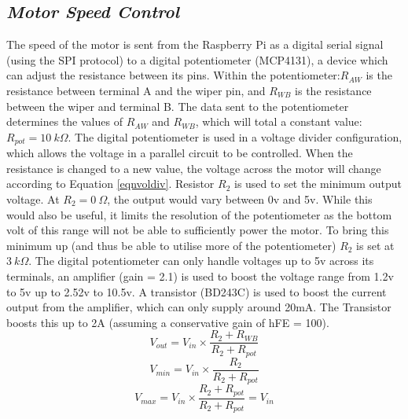 \documentclass[twoside,a4]{report}
\begin{document}
	\subsection*{\textit{Motor Speed Control}} %
	The speed of the motor is sent from the Raspberry Pi as a digital serial signal (using the SPI protocol) to a digital potentiometer (MCP4131), a device which can adjust the resistance between its pins. Within the potentiometer:\(R_{AW}\) is the resistance between terminal A and the wiper pin, and \(R_{WB}\) is the resistance between the wiper and terminal B. The data sent to the potentiometer determines the values of \(R_{AW}\) and \(R_{WB}\), which will total a constant value: \(R_{pot} = 10\ k\Omega \). The digital potentiometer is used in a voltage divider configuration, which allows the voltage in a parallel circuit to be controlled. When the resistance is changed to a new value, the voltage across the motor will change according to Equation \ref{eqnvoldiv}. Resistor \(R_2\) is used to set the minimum output voltage. At \(R_2 = 0\ \Omega\), the output would vary between 0v and 5v. While this would also be useful, it limits the resolution of the potentiometer as the bottom volt of this range will not be able to sufficiently power the motor. To bring this minimum up (and thus be able to utilise more of the potentiometer) \(R_2\) is set at \(3\ k\Omega \). The digital potentiometer can only handle voltages up to 5v across its terminals, an amplifier (gain = 2.1) is used to boost the voltage range from 1.2v to 5v up to 2.52v to 10.5v. A transistor (BD243C) is used to boost the current output from the amplifier, which can only supply around 20mA. The Transistor boosts this up to 2A (assuming a conservative gain of hFE = 100).
	\begin{equation}
		V_{out} = V_{in}\times \frac{R_2 + R_{WB}}{R_2 + R_{pot}}
		\label{eqnvoldiv}
	\end{equation}
	\begin{equation}
		V_{min} = V_{in}\times \frac{R_2}{R_2 + R_{pot}}
		\label{eqnminvol}
	\end{equation}
	\begin{equation}
		V_{max} = V_{in}\times \frac{R_2 + R_{pot}}{R_2 + R_{pot}} = V_{in}
		\label{eqnmaxvol}
	\end{equation}
	
	
\end{document}
